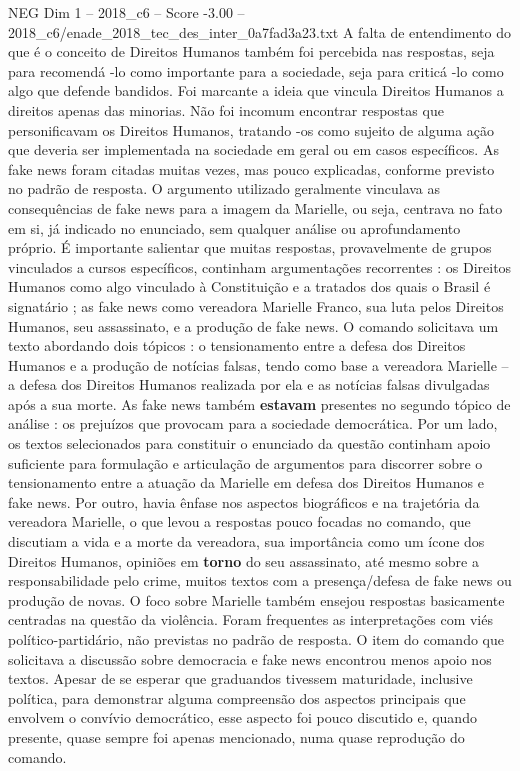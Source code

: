 \begin{textsample}{NEG Dim 1 – 2018\_c6 – Score -3.00 – 2018\_c6/enade\_2018\_tec\_des\_inter\_0a7fad3a23.txt}
A falta de entendimento do que é o conceito de Direitos Humanos também foi percebida nas respostas, seja para recomendá -lo como importante para a sociedade, seja para criticá -lo como algo que defende bandidos.
Foi marcante a ideia que vincula Direitos Humanos a direitos apenas das minorias.
Não foi incomum encontrar respostas que personificavam os Direitos Humanos, tratando -os como sujeito de alguma ação que deveria ser implementada na sociedade em geral ou em casos específicos.
As fake news foram citadas muitas vezes, mas pouco explicadas, conforme previsto no padrão de resposta.
O argumento utilizado geralmente vinculava as consequências de fake news para a imagem da Marielle, ou seja, centrava no fato em si, já indicado no enunciado, sem qualquer análise ou aprofundamento próprio.
É importante salientar que muitas respostas, provavelmente de grupos vinculados a cursos específicos, continham argumentações recorrentes : os Direitos Humanos como algo vinculado à Constituição e a tratados dos quais o Brasil é signatário ; as fake news como vereadora Marielle Franco, sua luta pelos Direitos Humanos, seu assassinato, e a produção de fake news.
O comando solicitava um texto abordando dois tópicos : o tensionamento entre a defesa dos Direitos Humanos e a produção de notícias falsas, tendo como base a vereadora Marielle – a defesa dos Direitos Humanos realizada por ela e as notícias falsas divulgadas após a sua morte.
As fake news também \textbf{estavam} presentes no segundo tópico de análise : os prejuízos que provocam para a sociedade democrática.
Por um lado, os textos selecionados para constituir o enunciado da questão continham apoio suficiente para formulação e articulação de argumentos para discorrer sobre o tensionamento entre a atuação da Marielle em defesa dos Direitos Humanos e fake news.
Por outro, havia ênfase nos aspectos biográficos e na trajetória da vereadora Marielle, o que levou a respostas pouco focadas no comando, que discutiam a vida e a morte da vereadora, sua importância como um ícone dos Direitos Humanos, opiniões em \textbf{torno} do seu assassinato, até mesmo sobre a responsabilidade pelo crime, muitos textos com a presença/defesa de fake news ou produção de novas.
O foco sobre Marielle também ensejou respostas basicamente centradas na questão da violência.
Foram frequentes as interpretações com viés político-partidário, não previstas no padrão de resposta.
O item do comando que solicitava a discussão sobre democracia e fake news encontrou menos apoio nos textos.
Apesar de se esperar que graduandos tivessem maturidade, inclusive política, para demonstrar alguma compreensão dos aspectos principais que envolvem o convívio democrático, esse aspecto foi pouco discutido e, quando presente, quase sempre foi apenas mencionado, numa quase reprodução do comando.

\end{textsample}
